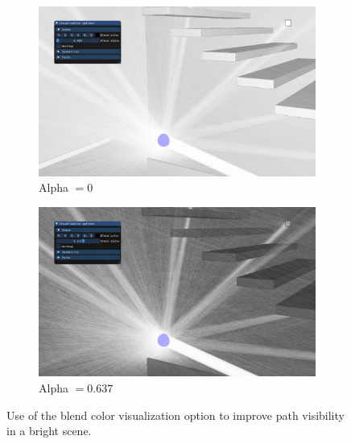 \begin{figure}
	\centering
	\begin{subfigure}[t]{0.49\linewidth}
		\includegraphics[width=\textwidth]{chapters/chapter_thetool/blendcolor_before}
		\caption{Alpha $= 0$}
	\end{subfigure}
	\begin{subfigure}[t]{0.49\linewidth}
		\includegraphics[width=\textwidth]{chapters/chapter_thetool/blendcolor_after}
		\caption{Alpha $= 0.637$}
	\end{subfigure}

	\caption{Use of the blend color visualization option to improve path visibility in a bright scene.}
	\label{blendcolor_fig}
\end{figure}

